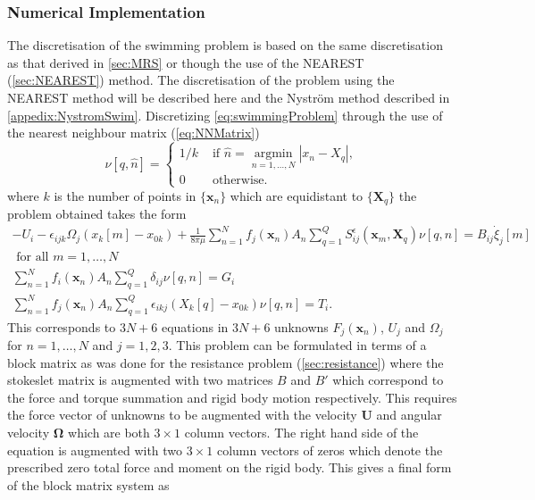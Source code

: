 \subsubsection{Numerical Implementation}
The discretisation of the swimming problem is based on the same discretisation as that derived in \cref{sec:MRS} or though the use of the NEAREST (\cref{sec:NEAREST}) method. The discretisation of the problem using the NEAREST method will be described here and the Nyström method described in \cref{appedix:NystromSwim}. Discretizing \cref{eq:swimmingProblem} through the use of the nearest neighbour matrix (\cref{eq:NNMatrix})
\begin{equation*}
    \nu [q, \hat{n}]= \begin{cases} 1/k & \text { if } \hat{n}=\underset{n=1, \ldots, N}{\operatorname{argmin}}|x_n-X_q| , \\ 0 & \text { otherwise. }\end{cases}
\end{equation*}
where $k$ is the number of points in $\{\bm{x}_n\}$ which are equidistant to $\{\bm{X}_q\}$ the problem obtained takes the form
\begin{equation*}
\begin{gathered}
    -U_{i}-\epsilon_{i j k} \Omega_{j}\left(x_k[{m}]-x_{0 k}\right)+\frac{1}{8 \pi\mu} \sum_{n=1}^N f_{j}(\bm{x}_n) A_n \sum_{q=1}^Q S_{i j}^{\epsilon}(\bm{x}_m, \bm{X}_q)\nu [q, n]  =  B_{i j} \dot{\xi}_{j}[m] \\ \text { for all } m = 1,\dots,N\\
    \sum_{n=1}^N f_{i}(\bm{x}_n) A_n \sum_{q=1}^Q \delta_{i j}\nu [q, n]= G_i \\
    \sum_{n=1}^N f_{j}(\bm{x}_n) A_n \sum_{q=1}^Q \epsilon_{i k j} (X_{k}[q]-x_{0 k}) \nu [q, n] = T_i.
\end{gathered}
\end{equation*}
This corresponds to $3N + 6$ equations in $3N + 6$ unknowns $F_j(\bm{x}_n)$, $U_j$ and $\Omega_j$ for $n=1,\dots,N$ and $j=1,2,3$.
This problem can be formulated in terms of a block matrix as was done for the resistance problem (\cref{sec:resistance}) where the stokeslet matrix is augmented with two matrices $B$ and $B'$ which correspond to the force and torque summation and rigid body motion respectively. This requires the force vector of unknowns to be augmented with the velocity $\boldsymbol{U}$ and angular velocity $\boldsymbol{\Omega}$ which are both $3 \times 1$ column vectors. The right hand side of the equation is augmented with two $3 \times 1$ column vectors of zeros which denote the prescribed zero total force and moment on the rigid body. This gives a final form of the block matrix system as

